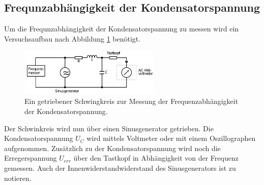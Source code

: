 \subsection{Frequnzabhängigkeit der Kondensatorspannung}
\label{sec:c}
Um die Frequnzabhängigkeit der Kondensatorspannung zu messen wird ein Versuchsaufbau nach Abbildung \ref{fig:c} benötigt. 
\begin{figure}[H]
    \centering
    \includegraphics[width=0.6\textwidth]{pictures/Aufbau_b.png}
    \caption{Ein getriebener Schwingkreis zur Messung der Frequenzabhängigkeit der Kondensatorspannung.\cite{AP01}}
    \label{fig:c}
\end{figure}
Der Schwinkreis wird nun über einen Sinusgenerator getrieben. Die Kondensatorspannung $U_C$ wird mittels Voltmeter oder mit einem Oszillographen
aufgenommen. Zusätzlich zu der Kondensatorspannung wird noch die Erregerspannung $U_{err}$ über den Tastkopf in Abhängigkeit von der Frequenz 
gemessen. Auch der Innenwiderstandwiderstand des Sinusgenerators ist zu notieren.